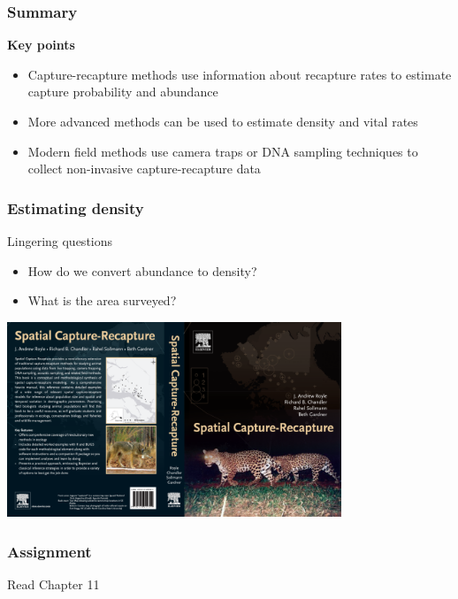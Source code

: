 \documentclass[color=usenames,dvipsnames]{beamer}\usepackage[]{graphicx}\usepackage[]{color}
\begin{document}
\begin{frame}
  \frametitle{Summary}
  \large
  {\bf Key points}
  \begin{itemize}
    \item Capture-recapture methods use information about recapture
      rates to estimate capture probability and abundance
    \item More advanced methods can be used to estimate density and vital rates
    \item Modern field methods use camera traps or DNA sampling techniques to collect non-invasive capture-recapture data
  \end{itemize}
\end{frame}







\begin{frame}
  \frametitle{Estimating density}
  \large
  {%
    Lingering questions}
  \begin{itemize}
    \item How do we convert abundance to density?
    \item What is the area surveyed?
  \end{itemize}
  \pause
  \begin{center}
    \includegraphics[width=0.75\textwidth]{figs/scrbook}
  \end{center}
\end{frame}




\begin{frame}
  \frametitle{Assignment}
  \centering
  \huge
  Read Chapter 11 \\
\end{frame}
\end{document}

